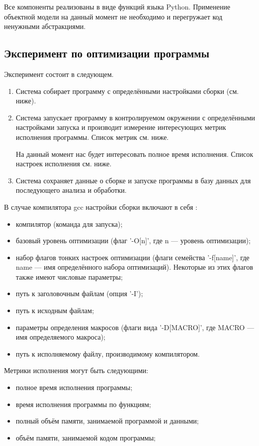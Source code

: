Все компоненты реализованы в виде функций языка {Python}. Применение объектной модели на данный момент не необходимо и перегружает код ненужными абстракциями.

\subsection{Эксперимент по оптимизации программы}
Эксперимент состоит в следующем.

\begin{enumerate}
	\item Система собирает программу с определёнными настройками сборки (см. ниже).

	\item Система запускает программу в контролируемом окружении с определёнными настройками запуска и производит измерение интересующих метрик исполнения программы. Список метрик см. ниже.

	На данный момент нас будет интересовать полное время исполнения.
	Список настроек исполнения см. ниже.

	\item Система сохраняет данные о сборке и запуске программы в базу данных для последующего анализа и обработки.
\end{enumerate}

В случае компилятора gcc настройки сборки включают в себя \cite{gcc-options}:
\begin{itemize}
    \item компилятор (команда для запуска);
    \item базовый уровень оптимизации (флаг '-O[n]', где n --- уровень оптимизации);
    \item набор флагов тонких настроек оптимизации (флаги семейства '-f[name]', где name --- имя определённого набора оптимизаций). Некоторые из этих флагов также имеют числовые параметры;
    \item путь к заголовочным файлам (опция '-I');
    \item путь к исходным файлам;
    \item параметры определения макросов (флаги вида '-D[MACRO]', где MACRO --- имя определяемого макроса);
    \item путь к исполняемому файлу, производимому компилятором.
\end{itemize}

Метрики исполнения могут быть следующими:
\begin{itemize}
    \item полное время исполнения программы;
    \item время исполнения программы по функциям;
    \item полный объём памяти, занимаемой программой и данными;
    \item объём памяти, занимаемой кодом программы;
\end{itemize}

